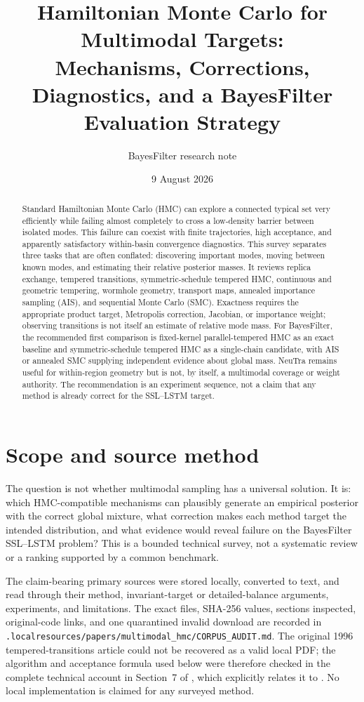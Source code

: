 \documentclass[11pt]{article}
\title{Hamiltonian Monte Carlo for Multimodal Targets:\\
Mechanisms, Corrections, Diagnostics, and a BayesFilter Evaluation Strategy}
\author{BayesFilter research note}
\date{9 August 2026}
\newcommand{\code}[1]{\texttt{#1}}
\begin{document}
\maketitle

\begin{abstract}
Standard Hamiltonian Monte Carlo (HMC) can explore a connected typical set very
efficiently while failing almost completely to cross a low-density barrier between
isolated modes.  This failure can coexist with finite trajectories, high acceptance,
and apparently satisfactory within-basin convergence diagnostics.  This survey
separates three tasks that are often conflated: discovering important modes, moving
between known modes, and estimating their relative posterior masses.  It reviews
replica exchange, tempered transitions, symmetric-schedule tempered HMC,
continuous and geometric tempering, wormhole geometry, transport maps, annealed
importance sampling (AIS), and sequential Monte Carlo (SMC).  Exactness requires
the appropriate product target, Metropolis correction, Jacobian, or importance
weight; observing transitions is not itself an estimate of relative mode mass.  For
BayesFilter, the recommended first comparison is fixed-kernel parallel-tempered HMC
as an exact baseline and symmetric-schedule tempered HMC as a single-chain
candidate, with AIS or annealed SMC supplying independent evidence about global
mass.  NeuTra remains useful for within-region geometry but is not, by itself, a
multimodal coverage or weight authority.  The recommendation is an experiment
sequence, not a claim that any method is already correct for the SSL--LSTM target.
\end{abstract}

\section{Scope and source method}

The question is not whether multimodal sampling has a universal solution.  It is:
which HMC-compatible mechanisms can plausibly generate an empirical posterior with
the correct global mixture, what correction makes each method target the intended
distribution, and what evidence would reveal failure on the BayesFilter SSL--LSTM
problem?  This is a bounded technical survey, not a systematic review or a ranking
supported by a common benchmark.

The claim-bearing primary sources were stored locally, converted to text, and read
through their method, invariant-target or detailed-balance arguments, experiments,
and limitations.  The exact files, SHA-256 values, sections inspected, original-code
links, and one quarantined invalid download are recorded in
\code{.localresources/papers/multimodal\_hmc/CORPUS\_AUDIT.md}.  The original
1996 tempered-transitions article could not be recovered as a valid local PDF; the
algorithm and acceptance formula used below were therefore checked in the complete
technical account in Section~7 of \citet{neal2001ais}, which explicitly relates it to
\citet{neal1996tempered}.  No local implementation is claimed for any surveyed
method.
\end{document}
